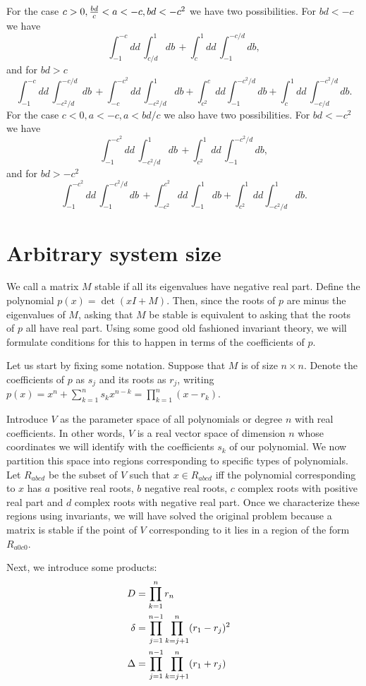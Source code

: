 \documentclass{amsart}
\theoremstyle{definition}
\theoremstyle{remark}
\numberwithin{equation}{section}
\begin{document}
For the case $c>0, {bd \over c} < a < -c, bd < -c^2$ we have two possibilities. For $bd < -c$ we have
$$
\int_{-1}^{-c} dd\, \int_{c/d}^1 db\, + \int_c^1 dd\, \int_{-1}^{-c/d} db,
$$
and for $bd > c$
$$
\int_{-1}^{-c} dd\, \int_{-c^2/d}^{-c/d} db\, + \int_{-c}^{-c^2} dd\, \int_{-c^2/d}^{1} db +
\int_{c^2}^{c} dd \int_{-1}^{-c^2/d} db +
\int_{c}^{1}dd\,\int_{-c/d}^{-c^2/d}db.
$$
For the case $c < 0, a < -c, a < bd/c$ we also have two possibilities. For $bd < -c^2$ we have
$$
\int_{-1}^{-c^2} dd\, \int_{-c^2/d}^1 db\, + \int_{c^2}^1 dd\, \int_{-1}^{-c^2/d} db,
$$
and for $bd > -c^2$
$$
\int_{-1}^{-c^2} dd\, \int_{-1}^{-c^2/d} db\, + \int_{-c^2}^{c^2} dd\, \int_{-1}^{1} db +
\int_{c^2}^{1} dd \int_{-c^2/d}^{1} db.
$$

\section{Arbitrary system size}
We call a matrix $M$ stable if all its eigenvalues have negative real
part.  Define the polynomial $p(x) = \det(xI + M)$.  Then, since the
roots of $p$ are minus the eigenvalues of $M$, asking that $M$ be
stable is equivalent to asking that the roots of $p$ all have real
part.  Using some good old fashioned invariant theory, we will
formulate conditions for this to happen in terms of the coefficients of
$p$.

Let us start by fixing some notation.  Suppose that $M$ is of size $n
\times n$.  Denote the coefficients of $p$ as $s_j$ and its roots as
$r_j$, writing $p(x) = x^n + \sum_{k=1}^n s_k x^{n-k} = \prod_{k=1}^n
(x-r_k)$.

Introduce $V$ as the parameter space of all polynomials or degree $n$
with real coefficients.  In other words, $V$ is a real vector space of
dimension $n$ whose coordinates we will identify with the coefficients
$s_k$ of our polynomial.  We now partition this space into regions
corresponding to specific types of polynomials.  Let $R_{abcd}$ be the
subset of $V$ such that $x \in R_{abcd}$ iff the polynomial
corresponding to $x$ has $a$ positive real roots, $b$ negative real
roots, $c$ complex roots with positive real part and $d$ complex roots
with negative real part.  Once we characterize these regions using
invariants, we will have solved the original problem because a matrix
is stable if the point of $V$ corresponding to it lies in a region of
the form $R_{a0c0}$.

Next, we introduce some products:
\begin{align}
D &= \prod_{k=1}^n r_n \cr
\delta &= \prod_{j=1}^{n-1} \prod_{k=j+1}^n (r_1 - r_j)^2 \cr
\Delta &= \prod_{j=1}^{n-1} \prod_{k=j+1}^n (r_1 + r_j) \cr
\end{align}
\end{document}
